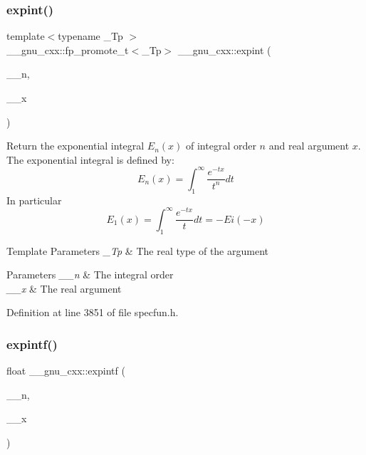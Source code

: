 \subsubsection{\texorpdfstring{expint()}{expint()}}
{\footnotesize\ttfamily template$<$typename \+\_\+\+Tp $>$ \\
\+\_\+\+\_\+gnu\+\_\+cxx\+::fp\+\_\+promote\+\_\+t$<$\+\_\+\+Tp$>$ \+\_\+\+\_\+gnu\+\_\+cxx\+::expint (\begin{DoxyParamCaption}\item[{unsigned int}]{\+\_\+\+\_\+n,  }\item[{\+\_\+\+Tp}]{\+\_\+\+\_\+x }\end{DoxyParamCaption})\hspace{0.3cm}{\ttfamily [inline]}}

Return the exponential integral $ E_n(x) $ of integral order $ n $ and real argument $ x $. The exponential integral is defined by\+: \[ E_n(x) = \int_1^\infty \frac{e^{-tx}}{t^n}dt \] In particular \[ E_1(x) = \int_1^\infty \frac{e^{-tx}}{t}dt = -Ei(-x) \]


\begin{DoxyTemplParams}{Template Parameters}
{\em \+\_\+\+Tp} & The real type of the argument \\
\hline
\end{DoxyTemplParams}

\begin{DoxyParams}{Parameters}
{\em \+\_\+\+\_\+n} & The integral order \\
\hline
{\em \+\_\+\+\_\+x} & The real argument \\
\hline
\end{DoxyParams}


Definition at line 3851 of file specfun.\+h.

\mbox{\label{group__gnu__math__spec__func_ga85751691a29807d99e990fcba61312f3}} 
\subsubsection{\texorpdfstring{expintf()}{expintf()}}
{\footnotesize\ttfamily float \+\_\+\+\_\+gnu\+\_\+cxx\+::expintf (\begin{DoxyParamCaption}\item[{unsigned int}]{\+\_\+\+\_\+n,  }\item[{float}]{\+\_\+\+\_\+x }\end{DoxyParamCaption})\hspace{0.3cm}{\ttfamily [inline]}}

